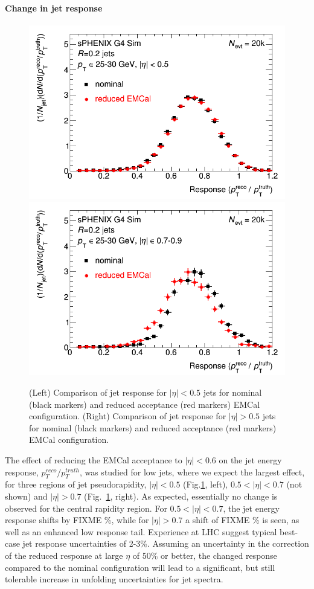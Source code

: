 \paragraph{Change in jet response} 
\begin{figure}[hbt]
  \centering
  \includegraphics[width=0.4\linewidth]{figs/jet_response_reduced_emcal_eta_0} 
  \hspace{0.1\linewidth}
  \includegraphics[width=0.4\linewidth]{figs/jet_response_reduced_emcal_eta_07}
  \caption{(Left) Comparison of jet response for $|\eta| <  0.5$ jets for nominal (black markers) and reduced acceptance (red markers) EMCal configuration.
  (Right) Comparison of jet response for $|\eta| > 0.5$ jets for nominal (black markers) and reduced acceptance (red markers) EMCal configuration.}
  \label{fig:jet_response_reduced_emcal}
\end{figure}

The effect of reducing the EMCal acceptance to $|\eta| < 0.6$ on the jet energy response, $p_T^{reco}/p_T^{truth}$, was studied
for low \pt jets, where we expect the largest effect, for three regions of jet pseudorapidity, $|\eta| < 0.5$ (Fig.\ref{fig:jet_response_reduced_emcal}, left), $0.5 < |\eta| < 0.7$ (not shown) and $|\eta| > 0.7$ (Fig.~\ref{fig:jet_response_reduced_emcal}, right). As expected, essentially no change
is observed for the central rapidity region. For $0.5 < |\eta| < 0.7$, the jet energy response shifts by FIXME \%, while for $|\eta| > 0.7$ a 
shift of FIXME \% is seen, as well as an enhanced low response tail. Experience at LHC suggest typical best-case jet response uncertainties
of 2-3\%. Assuming an uncertainty in the correction of the reduced response at large $\eta$ of 50\% or better, the changed response
compared to the nominal configuration will lead to a significant, but still tolerable increase in unfolding uncertainties for jet spectra.

